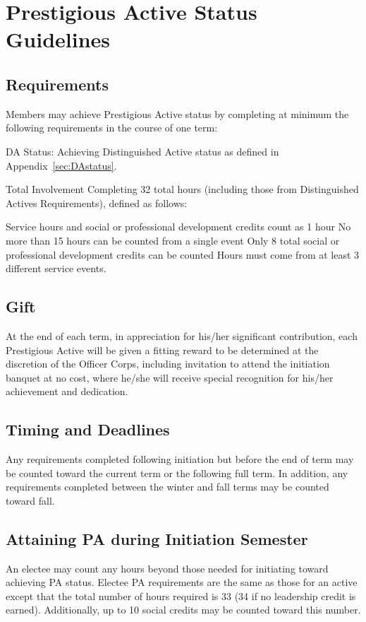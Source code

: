 \chapter{Prestigious Active Status Guidelines}\label{sec:PAstatus}
\section{Requirements} Members may achieve Prestigious Active status by completing at minimum the following requirements in the course of one term:
\begin{enumsubsection}
\item{DA Status:} Achieving Distinguished Active status as defined in Appendix~\ref{sec:DAstatus}.
\item{Total Involvement} Completing 32 total hours (including those from Distinguished Actives Requirements), defined as follows:
\begin{compactenum}[1.]
\itemnotoc Service hours and social or professional development credits count as 1 hour
\itemnotoc No more than 15 hours can be counted from a single event
\itemnotoc Only 8 total social or professional development credits  can be counted
\itemnotoc Hours must come from at least 3 different service events.
\end{compactenum}
\end{enumsubsection}
\section{Gift} At the end of each term, in appreciation for his/her significant contribution, each Prestigious Active will be given a fitting reward to be determined at the discretion of the Officer Corps, including invitation to attend the initiation banquet at no cost, where he/she will receive special recognition for his/her achievement and dedication.
\section{Timing and Deadlines} Any requirements completed following initiation but before the end of term may be counted toward the current term or the following full term. In addition, any requirements completed between the winter and fall terms may be counted toward fall. 

\section{Attaining PA during Initiation Semester} An electee may count any hours beyond those needed for initiating toward achieving PA status. Electee PA requirements are the same as those for an active except that the total number of hours required is 33 (34 if no leadership credit is earned). Additionally, up to 10 social credits may be counted toward this number.
